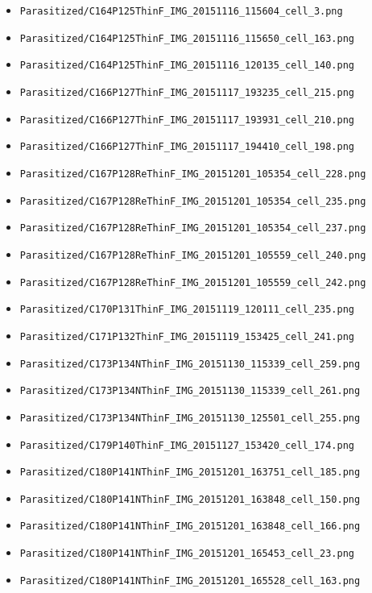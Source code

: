 \begin{itemize}
\item \texttt{Parasitized/C164P125ThinF\_IMG\_20151116\_115604\_cell\_3.png}
\item \texttt{Parasitized/C164P125ThinF\_IMG\_20151116\_115650\_cell\_163.png}
\item \texttt{Parasitized/C164P125ThinF\_IMG\_20151116\_120135\_cell\_140.png}
\item \texttt{Parasitized/C166P127ThinF\_IMG\_20151117\_193235\_cell\_215.png}
\item \texttt{Parasitized/C166P127ThinF\_IMG\_20151117\_193931\_cell\_210.png}
\item \texttt{Parasitized/C166P127ThinF\_IMG\_20151117\_194410\_cell\_198.png}
\item \texttt{Parasitized/C167P128ReThinF\_IMG\_20151201\_105354\_cell\_228.png}
\item \texttt{Parasitized/C167P128ReThinF\_IMG\_20151201\_105354\_cell\_235.png}
\item \texttt{Parasitized/C167P128ReThinF\_IMG\_20151201\_105354\_cell\_237.png}
\item \texttt{Parasitized/C167P128ReThinF\_IMG\_20151201\_105559\_cell\_240.png}
\item \texttt{Parasitized/C167P128ReThinF\_IMG\_20151201\_105559\_cell\_242.png}
\item \texttt{Parasitized/C170P131ThinF\_IMG\_20151119\_120111\_cell\_235.png}
\item \texttt{Parasitized/C171P132ThinF\_IMG\_20151119\_153425\_cell\_241.png}
\item \texttt{Parasitized/C173P134NThinF\_IMG\_20151130\_115339\_cell\_259.png}
\item \texttt{Parasitized/C173P134NThinF\_IMG\_20151130\_115339\_cell\_261.png}
\item \texttt{Parasitized/C173P134NThinF\_IMG\_20151130\_125501\_cell\_255.png}
\item \texttt{Parasitized/C179P140ThinF\_IMG\_20151127\_153420\_cell\_174.png}
\item \texttt{Parasitized/C180P141NThinF\_IMG\_20151201\_163751\_cell\_185.png}
\item \texttt{Parasitized/C180P141NThinF\_IMG\_20151201\_163848\_cell\_150.png}
\item \texttt{Parasitized/C180P141NThinF\_IMG\_20151201\_163848\_cell\_166.png}
\item \texttt{Parasitized/C180P141NThinF\_IMG\_20151201\_165453\_cell\_23.png}
\item \texttt{Parasitized/C180P141NThinF\_IMG\_20151201\_165528\_cell\_163.png}

\end{itemize}
